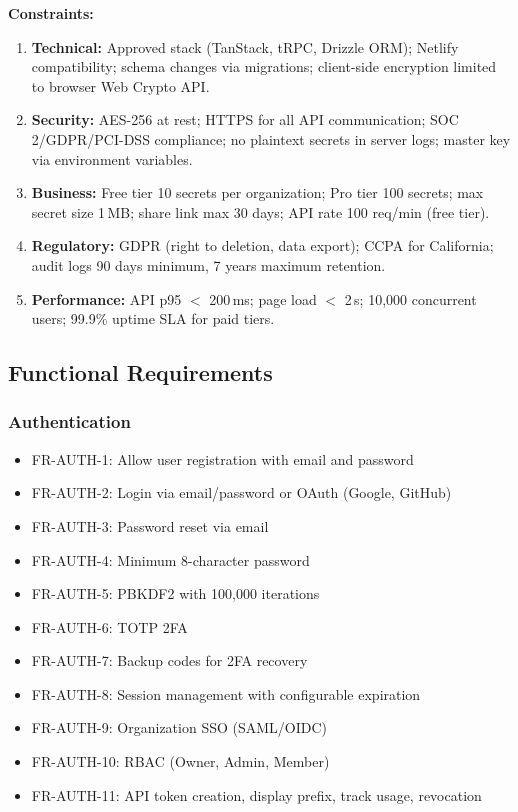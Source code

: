 \documentclass[12pt,a4paper]{article}
\begin{document}
\textbf{Constraints:}
\begin{enumerate}[leftmargin=*, itemsep=0.2em]
  \item \textbf{Technical:} Approved stack (TanStack, tRPC, Drizzle ORM); Netlify compatibility; schema changes via migrations; client-side encryption limited to browser Web Crypto API.
  \item \textbf{Security:} AES-256 at rest; HTTPS for all API communication; SOC 2/GDPR/PCI-DSS compliance; no plaintext secrets in server logs; master key via environment variables.
  \item \textbf{Business:} Free tier 10 secrets per organization; Pro tier 100 secrets; max secret size 1\,MB; share link max 30 days; API rate 100 req/min (free tier).
  \item \textbf{Regulatory:} GDPR (right to deletion, data export); CCPA for California; audit logs 90 days minimum, 7 years maximum retention.
  \item \textbf{Performance:} API p95 $<$ 200\,ms; page load $<$ 2\,s; 10,000 concurrent users; 99.9\% uptime SLA for paid tiers.
\end{enumerate}

\subsection*{\fontsize{14pt}{1.2} Functional Requirements}

\subsubsection*{Authentication}
\begin{itemize}[leftmargin=*, itemsep=0.1em]
  \item FR-AUTH-1: Allow user registration with email and password
  \item FR-AUTH-2: Login via email/password or OAuth (Google, GitHub)
  \item FR-AUTH-3: Password reset via email
  \item FR-AUTH-4: Minimum 8-character password
  \item FR-AUTH-5: PBKDF2 with 100,000 iterations
  \item FR-AUTH-6: TOTP 2FA
  \item FR-AUTH-7: Backup codes for 2FA recovery
  \item FR-AUTH-8: Session management with configurable expiration
  \item FR-AUTH-9: Organization SSO (SAML/OIDC)
  \item FR-AUTH-10: RBAC (Owner, Admin, Member)
  \item FR-AUTH-11: API token creation, display prefix, track usage, revocation
\end{itemize}
\end{document}
